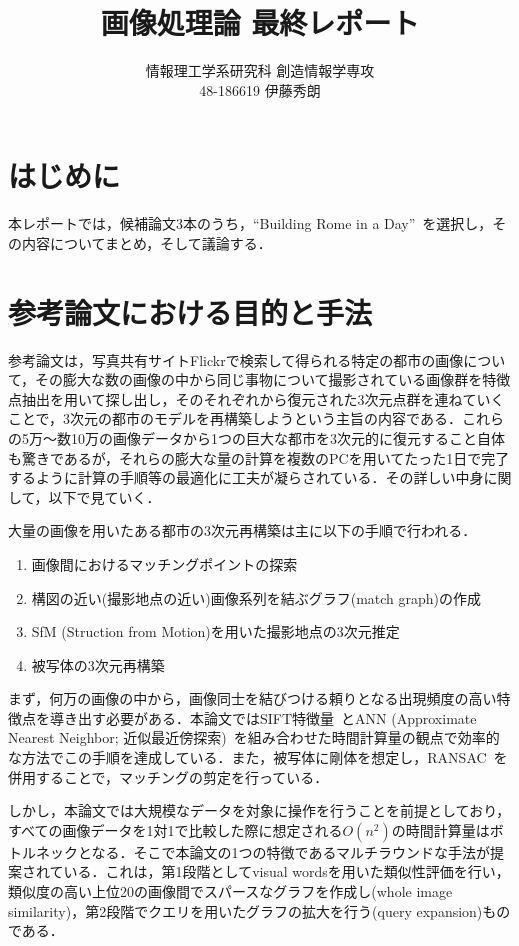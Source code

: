 \documentclass[onecolumn]{preport}
\title{画像処理論 最終レポート}
\author{情報理工学系研究科 創造情報学専攻\\
48-186619 伊藤秀朗}
\begin{document}
\pagestyle{empty}
\maketitle
\thispagestyle{empty}
\sloppy

\Large

\section{はじめに}

本レポートでは，候補論文3本のうち，``Building Rome in a Day''~\cite{Rome}を選択し，その内容についてまとめ，そして議論する．

\section{参考論文における目的と手法}

参考論文は，写真共有サイトFlickrで検索して得られる特定の都市の画像について，その膨大な数の画像の中から同じ事物について撮影されている画像群を特徴点抽出を用いて探し出し，そのそれぞれから復元された3次元点群を連ねていくことで，3次元の都市のモデルを再構築しようという主旨の内容である．これらの5万〜数10万の画像データから1つの巨大な都市を3次元的に復元すること自体も驚きであるが，それらの膨大な量の計算を複数のPCを用いてたった1日で完了するように計算の手順等の最適化に工夫が凝らされている．その詳しい中身に関して，以下で見ていく．

大量の画像を用いたある都市の3次元再構築は主に以下の手順で行われる．

\begin{enumerate}
  \item 画像間におけるマッチングポイントの探索
  \item 構図の近い(撮影地点の近い)画像系列を結ぶグラフ(match graph)の作成
  \item SfM (Struction from Motion)を用いた撮影地点の3次元推定
  \item 被写体の3次元再構築
\end{enumerate}

まず，何万の画像の中から，画像同士を結びつける頼りとなる出現頻度の高い特徴点を導き出す必要がある．本論文ではSIFT特徴量~\cite{SIFT}とANN (Approximate Nearest Neighbor; 近似最近傍探索)~\cite{ANN}を組み合わせた時間計算量の観点で効率的な方法でこの手順を達成している．また，被写体に剛体を想定し，RANSAC~\cite{RANSAC}を併用することで，マッチングの剪定を行っている．

しかし，本論文では大規模なデータを対象に操作を行うことを前提としており，すべての画像データを1対1で比較した際に想定される\(O(n^2)\)の時間計算量はボトルネックとなる．そこで本論文の1つの特徴であるマルチラウンドな手法が提案されている．これは，第1段階としてvisual wordsを用いた類似性評価を行い，類似度の高い上位20の画像間でスパースなグラフを作成し(whole image similarity)，第2段階でクエリを用いたグラフの拡大を行う(query expansion)ものである．
\end{document}

